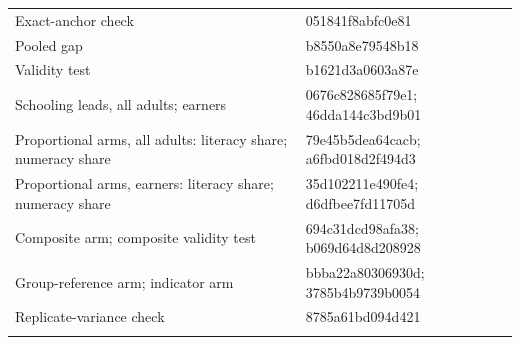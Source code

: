 \begin{tabular}{@{}ll@{}}
Exact-anchor check & 051841f8abfc0e81\\
Pooled gap & b8550a8e79548b18\\
Validity test & b1621d3a0603a87e\\
Schooling leads, all adults; earners & 0676c828685f79e1; 46dda144c3bd9b01\\
Proportional arms, all adults: literacy share; numeracy share & 79e45b5dea64cacb; a6fbd018d2f494d3\\
Proportional arms, earners: literacy share; numeracy share & 35d102211e490fe4; d6dfbee7fd11705d\\
Composite arm; composite validity test & 694c31dcd98afa38; b069d64d8d208928\\
Group-reference arm; indicator arm & bbba22a80306930d; 3785b4b9739b0054\\
Replicate-variance check & 8785a61bd094d421\\
\botrule
\end{tabular}
